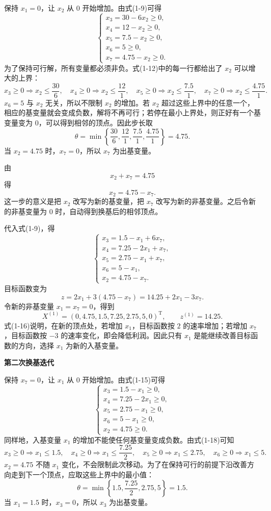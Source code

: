 ﻿\documentclass[UTF8,zihao=-4,fontset=none]{ctexart}
\newcommand{\stepheading}[1]{\vspace{0.6em}\noindent\textbf{#1}\par}
\begin{document}
保持 \(x_1=0\)，让 \(x_2\) 从 \(0\) 开始增加。由式(1-9)可得
\[
    \begin{cases}
    x_3=30-6x_2\ge 0,\\
    x_4=12-x_2\ge 0,\\
    x_5=7.5-x_2\ge 0,\\
    x_6=5\ge 0,\\
    x_7=4.75-x_2\ge 0.
    \end{cases} \tag{1-12}
\]
为了保持可行解，所有变量都必须非负。式(1-12)中的每一行都给出了 \(x_2\) 可以增大的上界：
\[
    x_3\ge0\Rightarrow x_2\le \frac{30}{6},\quad
    x_4\ge0\Rightarrow x_2\le \frac{12}{1},\quad
    x_5\ge0\Rightarrow x_2\le \frac{7.5}{1},\quad
    x_7\ge0\Rightarrow x_2\le \frac{4.75}{1}.
\]
\(x_6=5\) 与 \(x_2\) 无关，所以不限制 \(x_2\) 的增加。若 \(x_2\) 超过这些上界中的任意一个，相应的基变量就会变成负数，解将不再可行；若停在最小上界处，则正好有一个基变量变为 \(0\)，可以得到相邻的顶点。因此步长取
\[
    \theta=\min\left\{\frac{30}{6},\frac{12}{1},\frac{7.5}{1},\frac{4.75}{1}\right\}=4.75. \tag{1-13}
\]
当 \(x_2=4.75\) 时，\(x_7=0\)，所以 \(x_7\) 为出基变量。

由
\[
    x_2+x_7=4.75
\]
得
\[
    x_2=4.75-x_7. \tag{1-14}
\]
这一步的意义是把 \(x_2\) 改写为新的基变量，把 \(x_7\) 改写为新的非基变量。之后令新的非基变量为 \(0\) 时，自动得到换基后的相邻顶点。

代入式(1-9)，得
\[
    \begin{cases}
    x_3=1.5-x_1+6x_7,\\
    x_4=7.25-2x_1+x_7,\\
    x_5=2.75-x_1+x_7,\\
    x_6=5-x_1,\\
    x_2=4.75-x_7.
    \end{cases} \tag{1-15}
\]
目标函数变为
\[
    z=2x_1+3(4.75-x_7)=14.25+2x_1-3x_7. \tag{1-16}
\]
令新的非基变量 \(x_1=x_7=0\)，得到
\[
    X^{(1)}=(0,4.75,1.5,7.25,2.75,5,0)^{\mathrm T},\qquad z^{(1)}=14.25. \tag{1-17}
\]
式(1-16)说明，在新的顶点处，若增加 \(x_1\)，目标函数按 \(2\) 的速率增加；若增加 \(x_7\)，目标函数按 \(-3\) 的速率变化，即会降低利润。因此只有 \(x_1\) 是能继续改善目标函数的方向，选择 \(x_1\) 为新的入基变量。

\stepheading{第二次换基迭代}

保持 \(x_7=0\)，让 \(x_1\) 从 \(0\) 开始增加。由式(1-15)可得
\[
    \begin{cases}
    x_3=1.5-x_1\ge 0,\\
    x_4=7.25-2x_1\ge 0,\\
    x_5=2.75-x_1\ge 0,\\
    x_6=5-x_1\ge 0,\\
    x_2=4.75\ge 0.
    \end{cases} \tag{1-18}
\]
同样地，入基变量 \(x_1\) 的增加不能使任何基变量变成负数。由式(1-18)可知
\[
    x_3\ge0\Rightarrow x_1\le1.5,\quad
    x_4\ge0\Rightarrow x_1\le\frac{7.25}{2},\quad
    x_5\ge0\Rightarrow x_1\le2.75,\quad
    x_6\ge0\Rightarrow x_1\le5.
\]
\(x_2=4.75\) 不随 \(x_1\) 变化，不会限制此次移动。为了在保持可行的前提下沿改善方向走到下一个顶点，应取这些上界中的最小值：
\[
    \theta=\min\left\{1.5,\frac{7.25}{2},2.75,5\right\}=1.5. \tag{1-19}
\]
当 \(x_1=1.5\) 时，\(x_3=0\)，所以 \(x_3\) 为出基变量。
\end{document}
